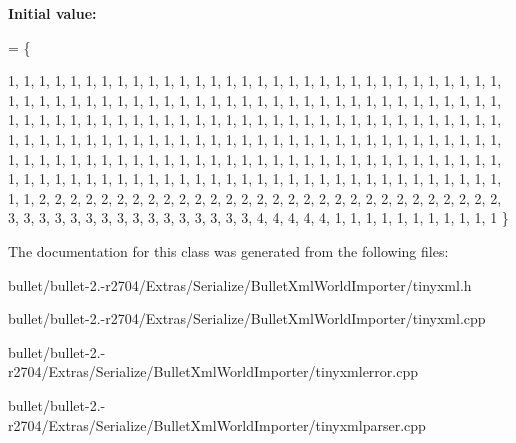 {\bfseries Initial value\+:}
\begin{DoxyCode}
= 
\{
    
        1,  1,  1,  1,  1,  1,  1,  1,  1,  1,  1,  1,  1,  1,  1,  1,  
        1,  1,  1,  1,  1,  1,  1,  1,  1,  1,  1,  1,  1,  1,  1,  1,  
        1,  1,  1,  1,  1,  1,  1,  1,  1,  1,  1,  1,  1,  1,  1,  1,  
        1,  1,  1,  1,  1,  1,  1,  1,  1,  1,  1,  1,  1,  1,  1,  1,  
        1,  1,  1,  1,  1,  1,  1,  1,  1,  1,  1,  1,  1,  1,  1,  1,  
        1,  1,  1,  1,  1,  1,  1,  1,  1,  1,  1,  1,  1,  1,  1,  1,  
        1,  1,  1,  1,  1,  1,  1,  1,  1,  1,  1,  1,  1,  1,  1,  1,  
        1,  1,  1,  1,  1,  1,  1,  1,  1,  1,  1,  1,  1,  1,  1,  1,  
        1,  1,  1,  1,  1,  1,  1,  1,  1,  1,  1,  1,  1,  1,  1,  1,  
        1,  1,  1,  1,  1,  1,  1,  1,  1,  1,  1,  1,  1,  1,  1,  1,  
        1,  1,  1,  1,  1,  1,  1,  1,  1,  1,  1,  1,  1,  1,  1,  1,  
        1,  1,  1,  1,  1,  1,  1,  1,  1,  1,  1,  1,  1,  1,  1,  1,  
        1,  1,  2,  2,  2,  2,  2,  2,  2,  2,  2,  2,  2,  2,  2,  2,  
        2,  2,  2,  2,  2,  2,  2,  2,  2,  2,  2,  2,  2,  2,  2,  2,  
        3,  3,  3,  3,  3,  3,  3,  3,  3,  3,  3,  3,  3,  3,  3,  3,  
        4,  4,  4,  4,  4,  1,  1,  1,  1,  1,  1,  1,  1,  1,  1,  1   
\}
\end{DoxyCode}


The documentation for this class was generated from the following files\+:\begin{DoxyCompactItemize}
\item 
bullet/bullet-\/2.-\/r2704/\+Extras/\+Serialize/\+Bullet\+Xml\+World\+Importer/tinyxml.\+h\item 
bullet/bullet-\/2.-\/r2704/\+Extras/\+Serialize/\+Bullet\+Xml\+World\+Importer/tinyxml.\+cpp\item 
bullet/bullet-\/2.-\/r2704/\+Extras/\+Serialize/\+Bullet\+Xml\+World\+Importer/tinyxmlerror.\+cpp\item 
bullet/bullet-\/2.-\/r2704/\+Extras/\+Serialize/\+Bullet\+Xml\+World\+Importer/tinyxmlparser.\+cpp\end{DoxyCompactItemize}
